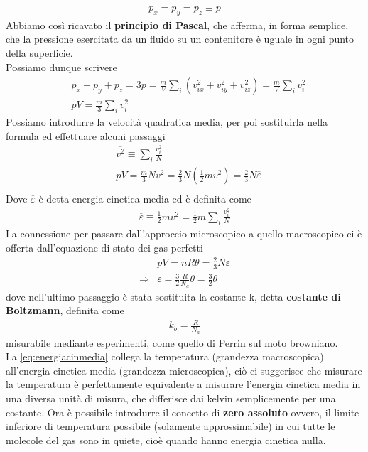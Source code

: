 \documentclass[10pt,a4paper]{article}
\begin{document}
\begin{align*}
	p_x = p_y = p_z \equiv p
\end{align*}
Abbiamo così ricavato il \textbf{principio di Pascal}, che afferma, in forma semplice, che la pressione esercitata da un fluido su un contenitore è uguale in ogni punto della superficie.\\
Possiamo dunque scrivere
\begin{align*}
	&p_x+p_y+p_z = 3p = \frac{m}{V} \sum_i (v_{ix}^2+v_{iy}^2+v_{iz}^2) = \frac{m}{V} \sum_i v_i^2\\
	&pV = \frac{m}{3}\sum_i v_i^2
\end{align*}
Possiamo introdurre la velocità quadratica media, per poi sostituirla nella formula ed effettuare alcuni passaggi
\begin{align*}
	&\overline{v^2} \equiv \sum_i\frac{v_i^2}{N}\\
	&pV = \frac{m}{3}N \overline{v^2} = \frac{2}{3} N (\frac{1}{2}m \overline{v^2})=\frac{2}{3}N \overline{\varepsilon}\\
\end{align*}
Dove $\overline{\varepsilon}$ è detta energia cinetica media ed è definita come
\begin{align*}
	\overline{\varepsilon} \equiv \frac{1}{2} m \overline{v^2} = \frac{1}{2} m \sum_i\frac{v_i^2}{N}
\end{align*}
La connessione per passare dall'approccio microscopico a quello macroscopico ci è offerta dall'equazione di stato dei gas perfetti
\begin{align}\label{eq:energiacinmedia}
	&pV = n R \theta = \frac{2}{3}N \overline{\varepsilon}\nonumber\\
	\Rightarrow & \overline{\varepsilon} = \frac{3}{2} \frac{R}{N_a} \theta = \frac{3}{2}\theta
\end{align}
dove nell'ultimo passaggio è stata sostituita la costante k, detta \textbf{costante di Boltzmann}, definita come
\begin{align*}
k_b = \frac{R}{N_a}
\end{align*}
misurabile mediante esperimenti, come quello di Perrin sul moto browniano.\\ 
La \ref{eq:energiacinmedia} collega la temperatura (grandezza macroscopica) all'energia cinetica media (grandezza microscopica), ciò ci suggerisce che misurare la temperatura è perfettamente equivalente a misurare l'energia cinetica media in una diversa unità di misura, che differisce dai kelvin semplicemente per una costante. Ora è possibile introdurre il concetto di \textbf{zero assoluto} ovvero, il limite inferiore di temperatura possibile (solamente approssimabile) in cui tutte le molecole del gas sono in quiete, cioè quando hanno energia cinetica nulla.\\
\end{document}
